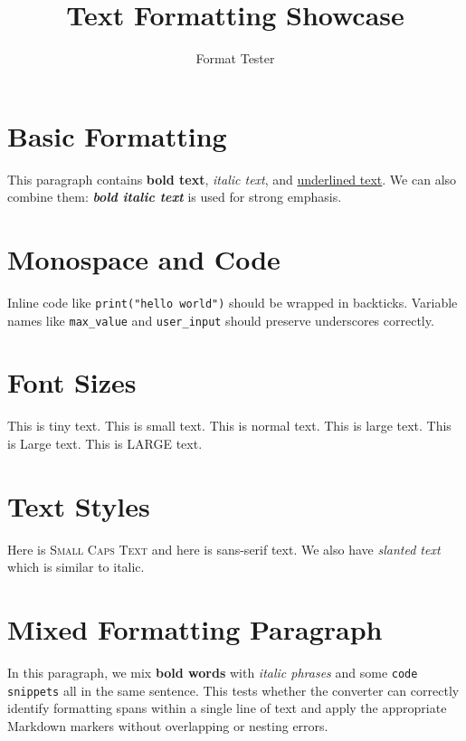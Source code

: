 \documentclass[12pt]{article}
\title{Text Formatting Showcase}
\author{Format Tester}
\begin{document}
\maketitle

\section{Basic Formatting}
This paragraph contains \textbf{bold text}, \textit{italic text}, and
\underline{underlined text}. We can also combine them: \textbf{\textit{bold
italic text}} is used for strong emphasis.

\section{Monospace and Code}
Inline code like \texttt{print("hello world")} should be wrapped in backticks.
Variable names like \texttt{max\_value} and \texttt{user\_input} should preserve
underscores correctly.

\section{Font Sizes}
{\tiny This is tiny text.}
{\small This is small text.}
{\normalsize This is normal text.}
{\large This is large text.}
{\Large This is Large text.}
{\LARGE This is LARGE text.}

\section{Text Styles}
Here is \textsc{Small Caps Text} and here is \textsf{sans-serif text}.
We also have \textsl{slanted text} which is similar to italic.

\section{Mixed Formatting Paragraph}
In this paragraph, we mix \textbf{bold words} with \textit{italic phrases} and
some \texttt{code snippets} all in the same sentence. This tests whether the
converter can correctly identify formatting spans within a single line of text
and apply the appropriate Markdown markers without overlapping or nesting errors.
\end{document}
